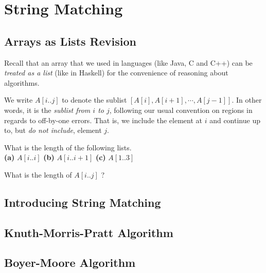 
\chapter{String Matching}


\section{Arrays as Lists Revision}

Recall that an array that we used in languages (like Java, C and C++)
can be \textit{treated as a list} (like in Haskell) for the convenience of reasoning 
about algorithms. 

We write $A[i..j]$ to denote the sublist $[A[i], A[i+1], \cdots, A[j-1]]$. 
In other words, it is the \textit{sublist from $i$ to $j$}, following our usual 
convention on regions in regards to off-by-one errors.
That is, we include the element at $i$ and continue up to, but \textit{do not include}, element $j$.

\begin{figure}[h]
\end{figure} 

\frmrule

\begin{example}
What is the length of the following lists. \\
\textbf{(a)} $A[i..i]$ \textbf{(b)} $A[i..i+1]$ \textbf{(c)} $A[1..3]$ 
\end{example}



\begin{example}
What is the length of $A[i..j]$ ?
\end{example}



\section{Introducing String Matching}



\section{Knuth-Morris-Pratt Algorithm}


\section{Boyer-Moore Algorithm}